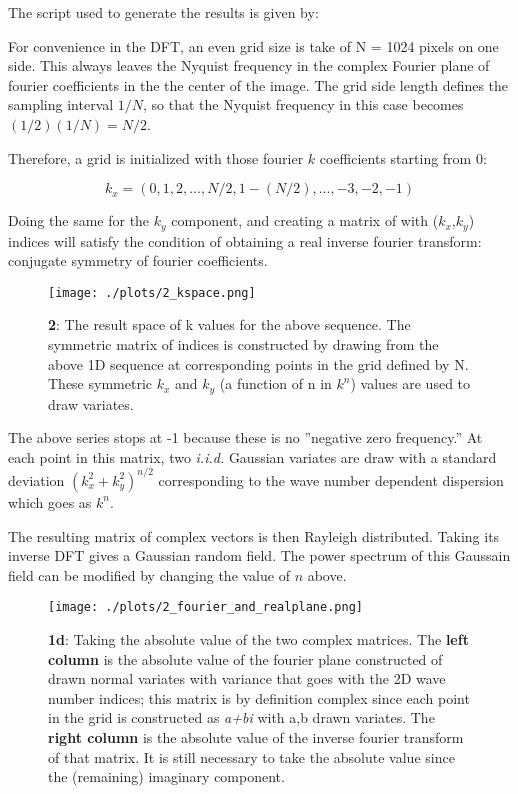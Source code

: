 The script used to generate the results is given by:




For convenience in the DFT, an even grid size is take of N = 1024 pixels on one side. This always leaves the Nyquist frequency in the complex Fourier plane of fourier coefficients in the the center of the image. The grid side length defines the sampling interval $1/N$, so that the Nyquist frequency in this case becomes $(1/2)(1/N) = N/2$.

Therefore, a grid is initialized with those fourier $k$ coefficients starting from 0:

\begin{equation}
    k_x=(0,1,2, ... , N/2, 1- (N/2), ... , -3,-2,-1)
\end{equation}

Doing the same for the $k_y$ component, and creating a matrix of with ($k_x$,$k_y$) indices will satisfy the condition of obtaining a real inverse fourier transform: conjugate symmetry of fourier coefficients.

\begin{figure}[h!]
  \centering
  \texttt{[image: ./plots/2\_kspace.png]}
  \caption{\textbf{2}: The result space of k values for the above sequence. The symmetric matrix of indices is constructed by drawing from the above 1D sequence at corresponding points in the grid defined by N. These symmetric $k_x$ and $k_y$ (a function of n in $k^n$) values are used to draw variates.}
  \label{fig:kspace}
\end{figure}

The above series stops at -1 because these is no ''negative zero frequency.'' At each point in this matrix, two \textit{i.i.d.} Gaussian variates are draw with a standard deviation $(k_x^2+k_y^2)^{n/2}$ corresponding to the wave number dependent dispersion which goes as $k^n$.

The resulting matrix of complex vectors is then Rayleigh distributed. Taking its inverse DFT gives a Gaussian random field. The power spectrum of this Gaussain field can be modified by changing the value of $n$ above.

\begin{figure}[h!]
  \centering
  \texttt{[image: ./plots/2\_fourier\_and\_realplane.png]}
  \caption{\textbf{1d}: Taking the absolute value of the two complex matrices. The \textbf{left column} is the absolute value of the fourier plane constructed of drawn normal variates with variance that goes with the 2D wave number indices; this matrix is by definition complex since each point in the grid is constructed as \textit{a+bi} with a,b drawn variates. The \textbf{right column} is the absolute value of the inverse fourier transform of that matrix. It is still necessary to take the absolute value since the (remaining) imaginary component.}
  \label{fig:abs}
\end{figure}



